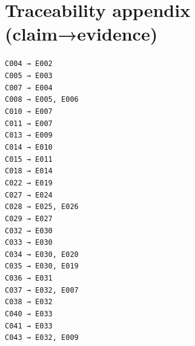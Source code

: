 \section*{Traceability appendix (claim→evidence)}
\tiny
\texttt{C004 → E002}\\
\texttt{C005 → E003}\\
\texttt{C007 → E004}\\
\texttt{C008 → E005, E006}\\
\texttt{C010 → E007}\\
\texttt{C011 → E007}\\
\texttt{C013 → E009}\\
\texttt{C014 → E010}\\
\texttt{C015 → E011}\\
\texttt{C018 → E014}\\
\texttt{C022 → E019}\\
\texttt{C027 → E024}\\
\texttt{C028 → E025, E026}\\
\texttt{C029 → E027}\\
\texttt{C032 → E030}\\
\texttt{C033 → E030}\\
\texttt{C034 → E030, E020}\\
\texttt{C035 → E030, E019}\\
\texttt{C036 → E031}\\
\texttt{C037 → E032, E007}\\
\texttt{C038 → E032}\\
\texttt{C040 → E033}\\
\texttt{C041 → E033}\\
\texttt{C043 → E032, E009}\\
